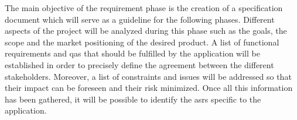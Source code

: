 The main objective of the requirement phase is the creation of a specification document which will serve as a guideline for the following phases. Different aspects of the project will be analyzed during this phase such as the goals, the scope and the market positioning of the desired product. A list of functional requirements and \glspl{qa} that should be fulfilled by the application will be established in order to precisely define the agreement between the different stakeholders. Moreover, a list of constraints and issues will be addressed so that their impact can be foreseen and their risk minimized. Once all this information has been gathered, it will be possible to identify the \glspl{asr} specific to the application. \cite[Chapter 16]{bass2013}
